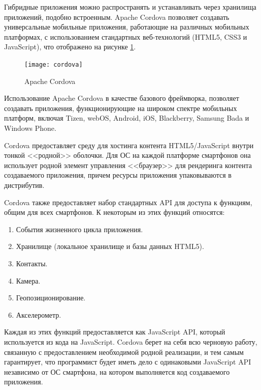 Гибридные приложения можно распространять и устанавливать через хранилища приложений, подобно встроенным. Apache Cordova позволяет создавать универсальные мобильные приложения, работающие на различных мобильных платформах, с использованием стандартных веб-технологий (HTML5, CSS3 и JavaScript), что отображено на рисунке \ref{cordova}.

\begin{figure}[ht]
\center\texttt{[image: cordova]}
\caption{Apache Cordova}\label{cordova}
\end{figure}

Использование Apache Cordova в качестве базового фреймворка, позволяет создавать приложения, функционирующие на широком спектре мобильных платформ, включая Tizen, webOS, Android, iOS, Blackberry, Samsung Bada и Windows Phone\cite{cordova}.

Cordova предоставляет среду для хостинга контента HTML5/JavaScript внутри тонкой <<родной>> оболочки. Для ОС на каждой платформе смартфонов она использует родной элемент управления <<браузер>> для рендеринга контента создаваемого приложения, причем ресурсы приложения упаковываются в дистрибутив.

Cordova также предоставляет набор стандартных API для доступа к функциям, общим для всех смартфонов. К некоторым из этих функций относятся:
\begin{enumerate}
\item События жизненного цикла приложения.
\item Хранилище (локальное хранилище и базы данных HTML5).
\item Контакты.
\item Камера.
\item Геопозиционирование.
\item Акселерометр.
\end{enumerate}

Каждая из этих функций предоставляется как JavaScript API, который используется из кода на JavaScript. Cordova берет на себя всю черновую работу, связанную с предоставлением необходимой родной реализации, и тем самым гарантирует, что программист будет иметь дело с одинаковыми JavaScript API независимо от ОС смартфона, на котором выполняется код создаваемого приложения. 

